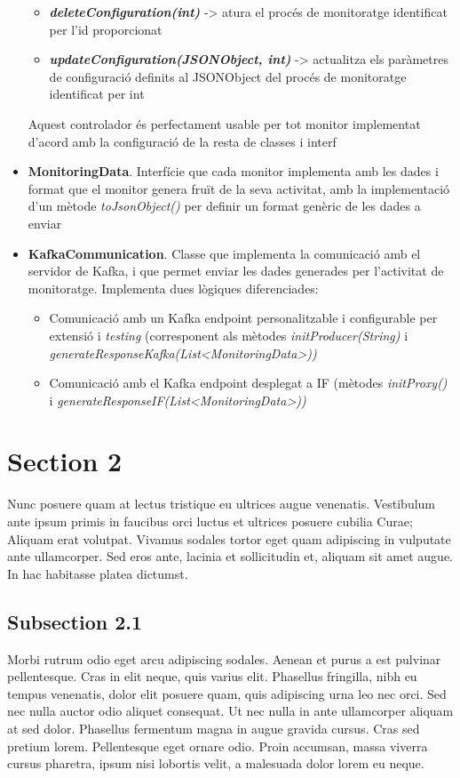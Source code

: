 \begin{itemize}
\begin{itemize}
\item \textbf{\textit{deleteConfiguration(int)}} -> atura el procés de monitoratge identificat per l'id proporcionat
\item \textbf{\textit{updateConfiguration(JSONObject, int)}} -> actualitza els paràmetres de configuració definits al JSONObject del procés de monitoratge identificat per int
\end{itemize}
Aquest controlador és perfectament usable per tot monitor implementat d'acord amb la configuració de la resta de classes i interf
\item \textbf{MonitoringData}. Interfície que cada monitor implementa amb les dades i format que el monitor genera fruït de la seva activitat, amb la implementació d'un mètode \textit{toJsonObject()} per definir un format genèric de les dades a enviar
\item \textbf{KafkaCommunication}. Classe que implementa la comunicació amb el servidor de Kafka, i que permet enviar les dades generades per l'activitat de monitoratge. Implementa dues lògiques diferenciades:
\begin{itemize}
\item Comunicació amb un Kafka endpoint personalitzable i configurable per extensió i \textit{testing} (corresponent als mètodes \textit{initProducer(String)} i \textit{generateResponseKafka(List<MonitoringData>))}
\item Comunicació amb el Kafka endpoint desplegat a IF (mètodes \textit{initProxy()} i \textit{generateResponseIF(List<MonitoringData>))}
\end{itemize}
\end{itemize}

\section{Section 2}

Nunc posuere quam at lectus tristique eu ultrices augue venenatis. Vestibulum ante ipsum primis in faucibus orci luctus et ultrices posuere cubilia Curae; Aliquam erat volutpat. Vivamus sodales tortor eget quam adipiscing in vulputate ante ullamcorper. Sed eros ante, lacinia et sollicitudin et, aliquam sit amet augue. In hac habitasse platea dictumst.


\subsection{Subsection 2.1}
Morbi rutrum odio eget arcu adipiscing sodales. Aenean et purus a est pulvinar pellentesque. Cras in elit neque, quis varius elit. Phasellus fringilla, nibh eu tempus venenatis, dolor elit posuere quam, quis adipiscing urna leo nec orci. Sed nec nulla auctor odio aliquet consequat. Ut nec nulla in ante ullamcorper aliquam at sed dolor. Phasellus fermentum magna in augue gravida cursus. Cras sed pretium lorem. Pellentesque eget ornare odio. Proin accumsan, massa viverra cursus pharetra, ipsum nisi lobortis velit, a malesuada dolor lorem eu neque.